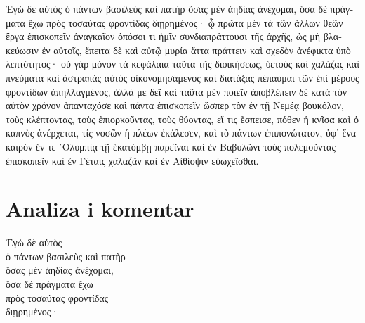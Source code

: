 {\large
\begin{greek}
\noindent Ἐγὼ δὲ αὐτὸς ὁ πάντων βασιλεὺς καὶ πατὴρ ὅσας μὲν ἀηδίας ἀνέχομαι, ὅσα δὲ πράγματα ἔχω πρὸς τοσαύτας φροντίδας διῃρημένος· ᾧ πρῶτα μὲν τὰ τῶν ἄλλων θεῶν ἔργα ἐπισκοπεῖν ἀναγκαῖον ὁπόσοι τι ἡμῖν συνδιαπράττουσι τῆς ἀρχῆς, ὡς μὴ βλακεύωσιν ἐν αὐτοῖς, ἔπειτα δὲ καὶ αὐτῷ μυρία ἄττα πράττειν καὶ σχεδὸν ἀνέφικτα ὑπὸ λεπτότητος· οὐ γὰρ μόνον τὰ κεφάλαια ταῦτα τῆς  διοικήσεως, ὑετοὺς καὶ χαλάζας καὶ πνεύματα καὶ ἀστραπὰς αὐτὸς οἰκονομησάμενος καὶ διατάξας πέπαυμαι τῶν ἐπὶ μέρους φροντίδων ἀπηλλαγμένος, ἀλλά με δεῖ καὶ ταῦτα μὲν ποιεῖν ἀποβλέπειν δὲ κατὰ τὸν αὐτὸν χρόνον ἁπανταχόσε καὶ πάντα ἐπισκοπεῖν ὥσπερ τὸν ἐν τῇ Νεμέᾳ βουκόλον, τοὺς κλέπτοντας, τοὺς ἐπιορκοῦντας, τοὺς θύοντας, εἴ τις ἔσπεισε, πόθεν ἡ κνῖσα καὶ ὁ καπνὸς ἀνέρχεται, τίς νοσῶν ἢ πλέων ἐκάλεσεν, καὶ τὸ πάντων ἐπιπονώτατον, ὑφ' ἕνα καιρὸν ἔν τε ᾿Ολυμπίᾳ τῇ ἑκατόμβῃ παρεῖναι καὶ ἐν Βαβυλῶνι τοὺς πολεμοῦντας ἐπισκοπεῖν καὶ ἐν Γέταις χαλαζᾶν καὶ ἐν Αἰθίοψιν εὐωχεῖσθαι.

\end{greek}

}

\section*{Analiza i komentar}
\begin{greek}

{\large
\noindent Ἐγὼ δὲ αὐτὸς \\
\tabto{2em} ὁ πάντων βασιλεὺς καὶ πατὴρ \\
ὅσας μὲν ἀηδίας ἀνέχομαι, \\
ὅσα δὲ πράγματα ἔχω \\
\tabto{2em} πρὸς τοσαύτας φροντίδας \\
διῃρημένος· \\

}
\end{greek}


